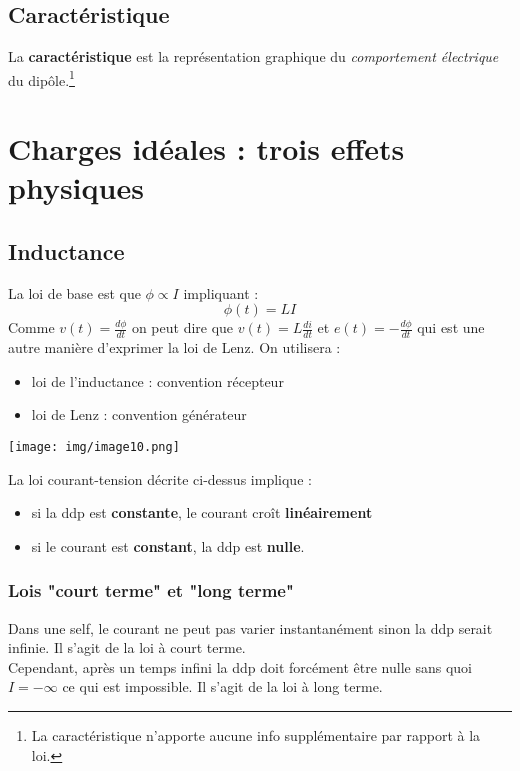 \documentclass	[11pt, a4paper, openany]{book}
\begin{document}
\subsection{Caractéristique}
La \textbf{caractéristique} est la représentation graphique du \textit{comportement électrique} du dipôle.\footnote{La caractéristique n'apporte aucune info supplémentaire par rapport à la loi.}

\setcounter{section}{2}
\section{Charges idéales : trois effets physiques}
\setcounter{subsection}{1}
\subsection{Inductance}
La loi de base est que $\phi \propto I$ impliquant :
\begin{equation}
\phi (t) = LI
\end{equation}
Comme $v(t) = \frac{d\phi}{dt}$ on peut dire que $v(t) = L\frac{di}{dt}$ et $e(t) = -\frac{d\phi}{dt}$ qui est une autre manière d'exprimer la loi de Lenz. On utilisera :
\begin{itemize}
\item loi de l'inductance : convention récepteur
\item loi de Lenz : convention générateur
\end{itemize}

\begin{center}
\texttt{[image: img/image10.png]}
\end{center}

La loi courant-tension décrite ci-dessus implique :
\begin{itemize}
\item si la ddp est \textbf{constante}, le courant croît \textbf{linéairement}
\item si le courant est \textbf{constant}, la ddp est \textbf{nulle}.
\end{itemize}


\subsubsection{Lois "court terme" et "long terme"}
Dans une self, le courant ne peut pas varier instantanément sinon la ddp serait infinie. Il s'agit de la loi à court terme.\\
Cependant, après un temps infini la ddp doit forcément être nulle sans quoi $I = - \infty$ ce qui est impossible. Il s'agit de la loi à long terme.
\end{document}

